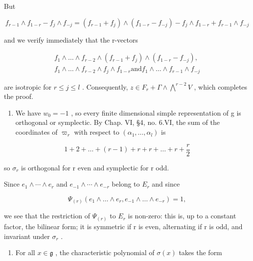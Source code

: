 But

\[
f _ {r - 1} \wedge f _ {1 - r} - f _ {j} \wedge f _ {- j} = (f _ {r - 1} + f _ {j}) \wedge (f _ {1 - r} - f _ {- j}) - f _ {j} \wedge f _ {1 - r} + f _ {r - 1} \wedge f _ {- j}
\]

and we verify immediately that the r-vectors

\[
\begin{array}{c} f _ {1} \wedge \dots \wedge f _ {r - 2} \wedge (f _ {r - 1} + f _ {j}) \wedge (f _ {1 - r} - f _ {- j}), \\ f _ {1} \wedge \dots \wedge f _ {r - 2} \wedge f _ {j} \wedge f _ {1 - r} \text {and} f _ {1} \wedge \dots \wedge f _ {r - 1} \wedge f _ {- j} \end{array}
\]

are isotropic for \(r \leq j \leq l\) . Consequently, \(z \in F_{r} + \Gamma \wedge \bigwedge^{r-2} V\) , which completes the proof.

\begin{enumerate}
\def\labelenumi{(\Alph{enumi})}
\setcounter{enumi}{21}
\tightlist
\item
  We have \(w_{0} = -1\) , so every finite dimensional simple representation of g is orthogonal or symplectic. By Chap. VI, §4, no. 6.VI, the sum of the coordinates of \(\varpi_{r}\) with respect to \((\alpha_{1}, \ldots, \alpha_{l})\) is
\end{enumerate}

\[
1 + 2 + \dots + (r - 1) + r + r + \dots + r + \frac {r}{2}
\]

so \(\sigma_{r}\) is orthogonal for r even and symplectic for r odd.

Since \(e_{1} \wedge \cdots \wedge e_{r}\) and \(e_{-1} \wedge \cdots \wedge e_{-r}\) belong to \(E_{r}\) and since

\[
\Psi_ {(r)} \left(e _ {1} \wedge \dots \wedge e _ {r}, e _ {- 1} \wedge \dots \wedge e _ {- r}\right) = 1,
\]

we see that the restriction of \(\Psi_{(r)}\) to \(E_{r}\) is non-zero: this is, up to a constant factor, the bilinear form; it is symmetric if r is even, alternating if r is odd, and invariant under \(\sigma_{r}\) .

\begin{enumerate}
\def\labelenumi{(\Roman{enumi})}
\setcounter{enumi}{5}
\tightlist
\item
  For all \(x \in \mathfrak{g}\) , the characteristic polynomial of \(\sigma(x)\) takes the form
\end{enumerate}

